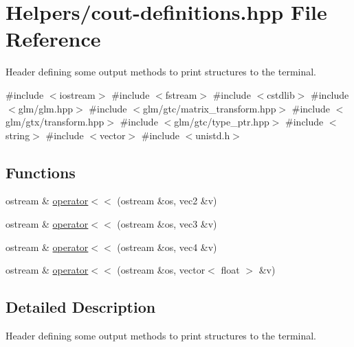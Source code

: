 \hypertarget{cout-definitions_8hpp}{}\section{Helpers/cout-\/definitions.hpp File Reference}
\label{cout-definitions_8hpp}


Header defining some output methods to print structures to the terminal.  


{\ttfamily \#include $<$iostream$>$}\newline
{\ttfamily \#include $<$fstream$>$}\newline
{\ttfamily \#include $<$cstdlib$>$}\newline
{\ttfamily \#include $<$glm/glm.\+hpp$>$}\newline
{\ttfamily \#include $<$glm/gtc/matrix\+\_\+transform.\+hpp$>$}\newline
{\ttfamily \#include $<$glm/gtx/transform.\+hpp$>$}\newline
{\ttfamily \#include $<$glm/gtc/type\+\_\+ptr.\+hpp$>$}\newline
{\ttfamily \#include $<$string$>$}\newline
{\ttfamily \#include $<$vector$>$}\newline
{\ttfamily \#include $<$unistd.\+h$>$}\newline
\subsection*{Functions}
\begin{DoxyCompactItemize}
\item 
ostream \& \mbox{\hyperlink{cout-definitions_8hpp_a423721485bc58bbd87f25262fc5748b7}{operator$<$$<$}} (ostream \&os, vec2 \&v)
\item 
ostream \& \mbox{\hyperlink{cout-definitions_8hpp_a9785ea3eade9968a62d5e9836f720617}{operator$<$$<$}} (ostream \&os, vec3 \&v)
\item 
ostream \& \mbox{\hyperlink{cout-definitions_8hpp_aced74fdd5c32b973692a20e6272a5f56}{operator$<$$<$}} (ostream \&os, vec4 \&v)
\item 
ostream \& \mbox{\hyperlink{cout-definitions_8hpp_a337249c538c5d8304a68a31ecc936c81}{operator$<$$<$}} (ostream \&os, vector$<$ float $>$ \&v)
\end{DoxyCompactItemize}


\subsection{Detailed Description}
Header defining some output methods to print structures to the terminal. 

